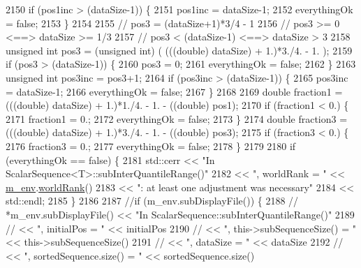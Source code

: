 \begin{DoxyCode}
2150   \textcolor{keywordflow}{if} (pos1inc > (dataSize-1)) \{
2151     pos1inc = dataSize-1;
2152     everythingOk = \textcolor{keyword}{false};
2153   \}
2154 
2155   \textcolor{comment}{// pos3 = (dataSize+1)*3/4 - 1}
2156   \textcolor{comment}{// pos3 >= 0            <==> dataSize >= 1/3}
2157   \textcolor{comment}{// pos3 <  (dataSize-1) <==> dataSize >  3 }
2158   \textcolor{keywordtype}{unsigned} \textcolor{keywordtype}{int} pos3 = (\textcolor{keywordtype}{unsigned} int) ( (((\textcolor{keywordtype}{double}) dataSize) + 1.)*3./4. - 1. );
2159   \textcolor{keywordflow}{if} (pos3 > (dataSize-1)) \{
2160     pos3 = 0;
2161     everythingOk = \textcolor{keyword}{false};
2162   \}
2163   \textcolor{keywordtype}{unsigned} \textcolor{keywordtype}{int} pos3inc = pos3+1;
2164   \textcolor{keywordflow}{if} (pos3inc > (dataSize-1)) \{
2165     pos3inc = dataSize-1;
2166     everythingOk = \textcolor{keyword}{false};
2167   \}
2168 
2169   \textcolor{keywordtype}{double} fraction1 = (((double) dataSize) + 1.)*1./4. - 1. - ((double) pos1);
2170   \textcolor{keywordflow}{if} (fraction1 < 0.) \{
2171     fraction1 = 0.;
2172     everythingOk = \textcolor{keyword}{false};
2173   \}
2174   \textcolor{keywordtype}{double} fraction3 = (((double) dataSize) + 1.)*3./4. - 1. - ((double) pos3);
2175   \textcolor{keywordflow}{if} (fraction3 < 0.) \{
2176     fraction3 = 0.;
2177     everythingOk = \textcolor{keyword}{false};
2178   \}
2179 
2180   \textcolor{keywordflow}{if} (everythingOk == \textcolor{keyword}{false}) \{
2181     std::cerr << \textcolor{stringliteral}{"In ScalarSequence<T>::subInterQuantileRange()"}
2182               << \textcolor{stringliteral}{", worldRank = "} << \hyperlink{class_q_u_e_s_o_1_1_scalar_sequence_a71618cd6351b29361b437af68447a4c8}{m\_env}.\hyperlink{class_q_u_e_s_o_1_1_base_environment_a78b57112bbd0e6dd0e8afec00b40ffa7}{worldRank}()
2183               << \textcolor{stringliteral}{": at least one adjustment was necessary"}
2184               << std::endl;
2185   \}
2186 
2187   \textcolor{comment}{//if (m\_env.subDisplayFile()) \{}
2188   \textcolor{comment}{//  *m\_env.subDisplayFile() << "In ScalarSequence::subInterQuantileRange()"}
2189   \textcolor{comment}{//                          << ", initialPos = "               << initialPos}
2190   \textcolor{comment}{//                          << ", this->subSequenceSize() = "  << this->subSequenceSize()}
2191   \textcolor{comment}{//                          << ", dataSize = "                 << dataSize}
2192   \textcolor{comment}{//                          << ", sortedSequence.size() = "    << sortedSequence.size()}

\end{DoxyCode}
